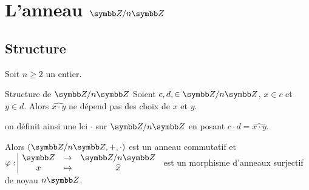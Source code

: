 \section{L'anneau \texorpdfstring{$\Z / n \Z$}{Z/nZ}}
\subsection{Structure}

Soit $n \geqslant 2$ un entier.

\begin{theoreme}{Structure de $\Z / n \Z$}{}
    Soient $c, d, \in \Z/ n \Z$, $x \in c $ et $y \in d$. Alors 
    $\widehat{x \cdot y}$ ne dépend pas des choix de $x$ et $y$.

    on définit ainsi une lci $\cdot$ sur $\Z / n \Z$  en posant $c \cdot d = \widehat{x \cdot y}$.

    Alors $(\Z / n \Z, +, \cdot)$ est un anneau commutatif et $\fonction{\varphi}{\Z}{\Z / n \Z}{x}{\widehat x}$ est un morphisme d'anneaux
    surjectif de noyau $n \Z$.
\end{theoreme}

